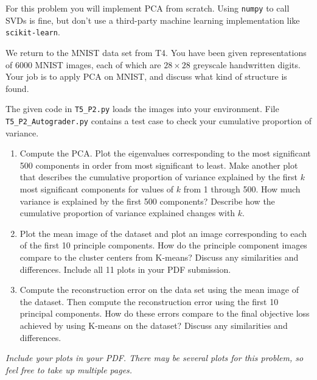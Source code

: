 \documentclass[submit]{harvardml}
\begin{document}
\begin{problem}

For this problem you will implement PCA from scratch.  Using
\texttt{numpy} to call SVDs is fine, but don't use a third-party
machine learning implementation like \texttt{scikit-learn}.

We return to the MNIST data set from T4. You have been given
representations of 6000 MNIST images, each of which are $28\times28$
greyscale handwritten digits. Your job is to apply PCA on MNIST, and
discuss what kind of structure is found.

The given code in \texttt{T5\_P2.py} loads the images into your environment.  File \texttt{T5\_P2\_Autograder.py} contains a test case to check your cumulative proportion of variance.

\begin{enumerate}

\item Compute the PCA. Plot the eigenvalues corresponding to the most significant 500
  components in order from most significant to least. Make another plot that describes the cumulative proportion of variance explained by the first $k$ most significant components for values of $k$ from 1 through 500.
  How much variance is explained by the first 500 components?  Describe
  how the cumulative proportion of variance explained changes with $k$.

\item Plot the mean image of the dataset and plot an image corresponding to each of the
  first 10 principle components.  How do the principle component images compare to the
  cluster centers from K-means? Discuss any similarities and
  differences.  Include all 11 plots in your PDF submission.

\item Compute the reconstruction error on the data set using the mean
  image of the dataset. Then compute the reconstruction error using the first 10 principal components. How do these
  errors compare to the final objective loss achieved by using K-means on the dataset? Discuss any similarities and
  differences.

\end{enumerate}


\textit{Include your plots in your PDF. There may be several plots for this problem, so feel free
to take up multiple pages.}
\end{problem}

\newpage
\end{document}
